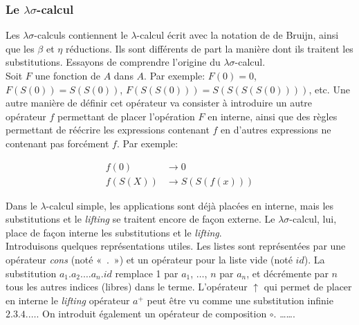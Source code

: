 \subsubsection{Le $\lambda \sigma$-calcul}

Les $\lambda \sigma$-calculs contiennent le $\lambda$-calcul écrit avec la notation de de Bruijn, ainsi que les $\beta$ et $\eta$ réductions. Ils sont différents de part la manière dont ils traitent les substitutions. Essayons de comprendre l’origine du $\lambda \sigma$-calcul. \\

Soit $F$ une fonction de $A$ dans $A$. Par exemple: $F(0)=0$, $F(S(0))=S(S(0))$, $F(S(S(0)))=S(S(S(S(0))))$, etc. Une autre manière de définir cet opérateur va consister à introduire un autre opérateur $f$ permettant de placer l’opération $F$ en interne, ainsi que des règles permettant de réécrire les expressions contenant $f$ en d’autres expressions ne contenant pas forcément $f$. Par exemple:

\begin{align*}
f(0) &\xrightarrow{}{0} \\
f(S(X)) &\xrightarrow{}{S(S(f(x)))}
\end{align*}

Dans le $\lambda$-calcul simple, les applications sont déjà placées en interne, mais les substitutions et le \textit{lifting} se traitent encore de façon externe. Le $\lambda \sigma$-calcul, lui, place de façon interne les substitutions et le \textit{lifting}. \\

Introduisons quelques représentations utiles. Les listes sont représentées par une opérateur \textit{cons} (noté « . ») et un opérateur pour la liste vide (noté $id$). La substitution $a_1.a_2. \dots a_n . id$ remplace 1 par $a_1$, $\dots$, $n$ par $a_n$, et décrémente par $n$ tous les autres indices (libres) dans le terme. L’opérateur $\uparrow$ qui permet de placer en interne le \textit{lifting} opérateur $a^{+}$ peut être vu comme une substitution infinie $2.3.4.\dots$. On introduit également un opérateur de composition $\circ$. …….

